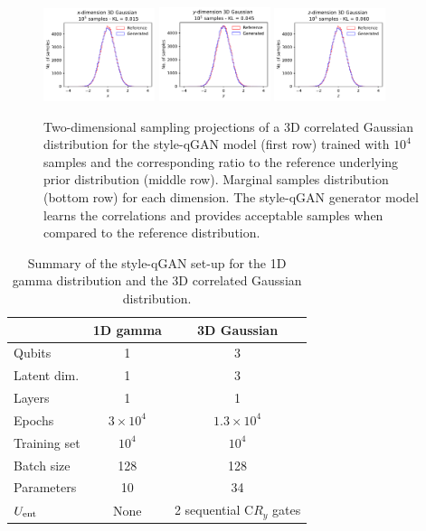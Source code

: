 \documentclass[twocolumn,preprintnumbers,superscriptaddress]{revtex4-2}
\begin{document}
\begin{figure}
  \includegraphics[width=0.29\textwidth]{plots/3Dgaussian_posdef/1-distribution_3dgaussian_100k.pdf}%
  \includegraphics[width=0.29\textwidth]{plots/3Dgaussian_posdef/2-distribution_3dgaussian_100k.pdf}%
  \includegraphics[width=0.29\textwidth]{plots/3Dgaussian_posdef/3-distribution_3dgaussian_100k.pdf}

  \caption{\label{fig:3dgauss}Two-dimensional sampling projections of a 3D
  correlated Gaussian distribution for the style-qGAN model (first row) trained
  with $10^4$ samples and the corresponding ratio to the reference underlying
  prior distribution (middle row). Marginal samples distribution (bottom row)
  for each dimension. The style-qGAN generator model learns the correlations and
  provides acceptable samples when compared to the reference distribution.}
\end{figure}

\begin{table}
  \begin{tabular}{l|c|c}
     & {\bf 1D gamma} & {\bf 3D Gaussian} \tabularnewline
    \hline
    Qubits & 1 & 3 \tabularnewline
    Latent dim. & 1 & 3 \tabularnewline
    Layers & 1 & 1 \tabularnewline
    Epochs & $3\times10^4$ & $1.3\times10^4$ \tabularnewline
    Training set & $10^4$ & $10^4$ \tabularnewline
    Batch size & 128 & 128 \tabularnewline
    Parameters & 10 & 34 \tabularnewline
    $U_{\rm ent}$ & None & 2 sequential C$R_y$ gates \tabularnewline
    \hline
  \end{tabular}

  \caption{\label{table:summary} Summary of the style-qGAN set-up for the 1D
  gamma distribution and the 3D correlated Gaussian distribution.}
\end{table}
\end{document}
